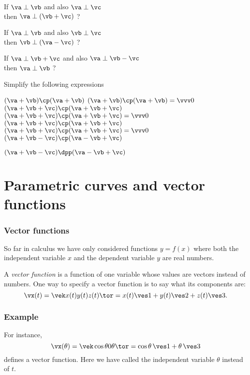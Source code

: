 \begin{multicols}{2}
\subprob If $\va\perp\vb$ and also $\va\perp\vc$\\[0.5ex]
  \null\hfill then $\va\perp(\vb+\vc)$ ?

\subprob If $\va\perp\vb$ and also $\vb\perp\vc$\\[0.5ex]
  \null\hfill  then $\vb\perp(\va-\vc)$ ?

\subprob If $\va\perp\vb+\vc$ and also $\va\perp\vb-\vc$\\[0.5ex]
  \null\hfill  then $\va\perp\vb$ ?

\problem Simplify the following expressions%

\subprob \(  (\va+\vb)\cp(\va+\vb) \)
\answer%
\(  (\va+\vb)\cp(\va+\vb) =\vvv0 \)
\endanswer
%
\subprob \(  (\va+\vb+\vc)\cp(\va+\vb+\vc) \)
\answer%
\(  (\va+\vb+\vc)\cp(\va+\vb+\vc) =\vvv0 \)
\endanswer
%
\subprob \(  (\va+\vb+\vc)\cp(\va+\vb+\vc) \)
\answer%
\(  (\va+\vb+\vc)\cp(\va+\vb+\vc) =\vvv0 \)
\endanswer
%
\subprob $(\va+\vb-\vc) \cp (\va-\vb+\vc)$

\subprob $(\va+\vb-\vc) \dpp (\va-\vb+\vc)$
\end{multicols}
\noproblemfont

\chapter{Parametric curves and vector functions} %

\subsection{Vector functions} %
So far in calculus we have only considered functions $y=f(x)$ where both the
independent variable $x$ and the dependent variable $y$ are real numbers.

A \emph{vector function} is a function of one variable whose values are vectors
instead of numbers.  One way to specify a vector function is to say what its
components are:
\[
  \vx(t) = \vek x(t) \\ y(t) \\ z(t)\tor = x(t)\ves1 +y(t)\ves2 + z(t)\ves3.
\]
\subsection*{Example} For instance,
\[
  \vx(\theta) = \vek\cos \theta \\ 0 \\\theta\tor  = \cos\theta\,\ves1 + \theta\,\ves3
\]
defines a vector function.  Here we have called the independent variable $\theta$
instead of $t$.

